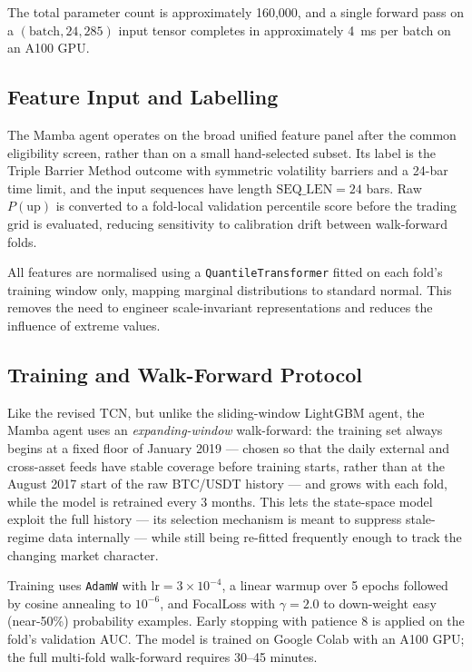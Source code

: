 The total parameter count is approximately 160,000, and a single forward pass on a $(\text{batch}, 24, 285)$ input tensor completes in approximately 4~ms per batch on an A100 GPU.

\subsection{Feature Input and Labelling}

The Mamba agent operates on the broad unified feature panel after the common eligibility screen, rather than on a small hand-selected subset. Its label is the Triple Barrier Method outcome with symmetric volatility barriers and a 24-bar time limit, and the input sequences have length $\text{SEQ\_LEN}=24$ bars. Raw $P(\text{up})$ is converted to a fold-local validation percentile score before the trading grid is evaluated, reducing sensitivity to calibration drift between walk-forward folds.


All features are normalised using a \texttt{QuantileTransformer} fitted on each fold's training window only, mapping marginal distributions to standard normal. This removes the need to engineer scale-invariant representations and reduces the influence of extreme values.

\subsection{Training and Walk-Forward Protocol}

Like the revised TCN, but unlike the sliding-window LightGBM agent, the Mamba agent uses an \textit{expanding-window} walk-forward: the training set always begins at a fixed floor of January 2019 --- chosen so that the daily external and cross-asset feeds have stable coverage before training starts, rather than at the August 2017 start of the raw BTC/USDT history --- and grows with each fold, while the model is retrained every 3 months. This lets the state-space model exploit the full history --- its selection mechanism is meant to suppress stale-regime data internally --- while still being re-fitted frequently enough to track the changing market character.


Training uses \texttt{AdamW} with $\text{lr} = 3\times10^{-4}$, a linear warmup over 5 epochs followed by cosine annealing to $10^{-6}$, and FocalLoss with $\gamma = 2.0$ to down-weight easy (near-50\%) probability examples. Early stopping with patience 8 is applied on the fold's validation AUC. The model is trained on Google Colab with an A100 GPU; the full multi-fold walk-forward requires 30--45 minutes.



